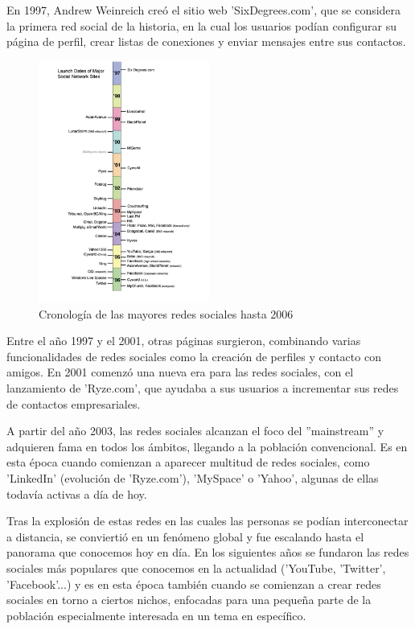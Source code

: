 En 1997, Andrew Weinreich creó el sitio web 'SixDegrees.com', que se considera la primera red social de la historia, en la cual los usuarios podían configurar su página de perfil, crear listas de conexiones y enviar mensajes entre sus contactos.

\begin{figure}[h]
	\centering
	\includegraphics[width = 0.5\textwidth]{Imagenes/Vectorial/cronologiaRRSS.pdf}
	\caption{Cronología de las mayores redes sociales hasta 2006 \citep{10.1111/j.1083-6101.2007.00393.x}}
	\label{fig:cronologiaRRSS}
\end{figure}

Entre el año 1997 y el 2001, otras páginas surgieron, combinando varias funcionalidades de redes sociales como la creación de perfiles y contacto con amigos. En 2001 comenzó una nueva era para las redes sociales, con el lanzamiento de 'Ryze.com', que ayudaba a sus usuarios a incrementar sus redes de contactos empresariales.

A partir del año 2003, las redes sociales alcanzan el foco del ''mainstream'' y adquieren fama en todos los ámbitos, llegando a la población convencional. Es en esta época cuando comienzan a aparecer multitud de redes sociales, como 'LinkedIn' (evolución de 'Ryze.com'), 'MySpace' o 'Yahoo', algunas de ellas todavía activas a día de hoy.

Tras la explosión de estas redes en las cuales las personas se podían interconectar a distancia, se conviertió en un fenómeno global y fue escalando hasta el panorama que conocemos hoy en día. En los siguientes años se fundaron las redes sociales más populares que conocemos en la actualidad ('YouTube, 'Twitter', 'Facebook'...) y es en esta época también cuando se comienzan a crear redes sociales en torno a ciertos nichos, enfocadas para una pequeña parte de la población especialmente interesada en un tema en específico.

